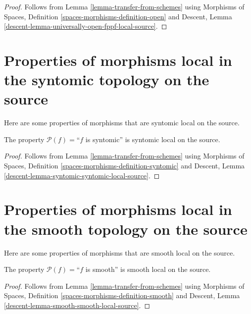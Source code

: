 \begin{proof}
Follows from
Lemma \ref{lemma-transfer-from-schemes}
using
Morphisms of Spaces, Definition \ref{spaces-morphisms-definition-open}
and
Descent, Lemma \ref{descent-lemma-universally-open-fppf-local-source}.
\end{proof}



\section{Properties of morphisms local in the syntomic topology on the source}
\label{section-syntomic-local-source}

\noindent
Here are some properties of morphisms that are syntomic local on the source.

\begin{lemma}
\label{lemma-syntomic-syntomic-local-source}
The property $\mathcal{P}(f)=$``$f$ is syntomic''
is syntomic local on the source.
\end{lemma}

\begin{proof}
Follows from
Lemma \ref{lemma-transfer-from-schemes}
using
Morphisms of Spaces, Definition \ref{spaces-morphisms-definition-syntomic}
and
Descent, Lemma \ref{descent-lemma-syntomic-syntomic-local-source}.
\end{proof}




\section{Properties of morphisms local in the smooth topology on the source}
\label{section-smooth-local-source}

\noindent
Here are some properties of morphisms that are smooth local on the source.

\begin{lemma}
\label{lemma-smooth-smooth-local-source}
The property $\mathcal{P}(f)=$``$f$ is smooth''
is smooth local on the source.
\end{lemma}

\begin{proof}
Follows from
Lemma \ref{lemma-transfer-from-schemes}
using
Morphisms of Spaces, Definition \ref{spaces-morphisms-definition-smooth}
and
Descent, Lemma \ref{descent-lemma-smooth-smooth-local-source}.
\end{proof}



